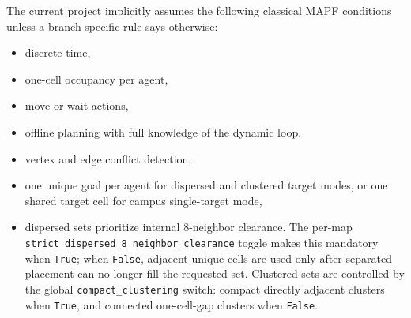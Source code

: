 \documentclass[11pt]{article}
\begin{document}
The current project implicitly assumes the following classical MAPF conditions unless a branch-specific rule says otherwise:
\begin{itemize}[leftmargin=2em]
    \item discrete time,
    \item one-cell occupancy per agent,
    \item move-or-wait actions,
    \item offline planning with full knowledge of the dynamic loop,
    \item vertex and edge conflict detection,
    \item one unique goal per agent for dispersed and clustered target modes, or one shared target cell for campus single-target mode,
    \item dispersed sets prioritize internal 8-neighbor clearance. The per-map \texttt{strict\_dispersed\_8\_neighbor\_clearance} toggle makes this mandatory when \texttt{True}; when \texttt{False}, adjacent unique cells are used only after separated placement can no longer fill the requested set. Clustered sets are controlled by the global \texttt{compact\_clustering} switch: compact directly adjacent clusters when \texttt{True}, and connected one-cell-gap clusters when \texttt{False}.
\end{itemize}
\end{document}
